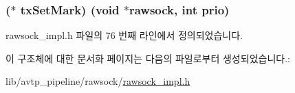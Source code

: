 \subsubsection[{\texorpdfstring{tx\+Set\+Mark}{txSetMark}}]{($\ast$ tx\+Set\+Mark) (void $\ast$rawsock, int prio)}\hypertarget{structrawsock__cb__t_a926003e5137976663821b27ace9c3dbf}{}\label{structrawsock__cb__t_a926003e5137976663821b27ace9c3dbf}


rawsock\+\_\+impl.\+h 파일의 76 번째 라인에서 정의되었습니다.



이 구조체에 대한 문서화 페이지는 다음의 파일로부터 생성되었습니다.\+:\begin{DoxyCompactItemize}
\item 
lib/avtp\+\_\+pipeline/rawsock/\hyperlink{rawsock__impl_8h}{rawsock\+\_\+impl.\+h}\end{DoxyCompactItemize}
